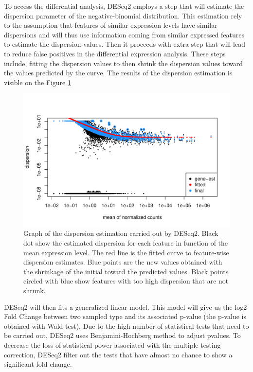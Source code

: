 \documentclass[a4paper, 11pt]{article}
\begin{document}
\begin{multicols}{2}
To access the differential analysis, DESeq2 employs a step that will estimate the dispersion parameter of the negative-binomial distribution. This estimation rely to the assumption that features of similar expression levels have similar dispersions and will thus use information coming from similar expressed features to estimate the dispersion values. Then it proceeds with extra step that will lead to reduce false positives in the differential expression analysis. These steps include, fitting the dispersion values to then shrink the dispersion values toward the values predicted by the curve. The results of the dispersion estimation is visible on the Figure \ref{fig:dispersion}
\begin{figure}[H]
	\centering
	\includegraphics[width=\columnwidth]{Figures/differential_analysis/dispersion.pdf}
	\caption{\footnotesize{Graph of the dispersion estimation carried out by DESeq2. Black dot show the estimated dispersion for each feature in function of the mean expression level. The red line is the fitted curve to feature-wise dispersion estimates. Blue points are the new values obtained with the shrinkage of the initial toward the predicted values. Black points circled with blue show features with too high dispersion that are not shrunk.}}
	\label{fig:dispersion}
\end{figure}

DESeq2 will then fits a generalized linear model. This model will give us the log2 Fold Change between two sampled type and its associated p-value (the p-value is obtained with Wald test). Due to the high number of statistical tests that need to be carried out, DESeq2 uses Benjamini-Hochberg method to adjust pvalues. To decrease the loss of statistical power associated with the multiple testing correction, DESeq2 filter out the tests that have almost no chance to show a significant fold change. 


\end{multicols}
\end{document}
